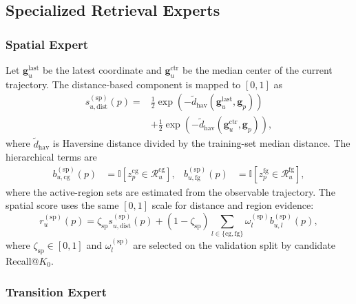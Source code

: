 \documentclass[journal]{IEEEtran}
\newcommand{\Ind}{\mathbb{I}}
\begin{document}
\subsection{Specialized Retrieval Experts}
\label{subsec:experts}

\subsubsection{Spatial Expert}

Let $\bm{g}_{u}^{\mathrm{last}}$ be the latest coordinate and
$\bm{g}_{u}^{\mathrm{ctr}}$ be the median center of the current trajectory.
The distance-based component is mapped to $[0,1]$ as
\begin{equation}
\begin{aligned}
s_{u,\mathrm{dist}}^{(\mathrm{sp})}(p)
={}&\frac{1}{2}\exp\!\left(-\widetilde d_{\mathrm{hav}}
(\bm{g}_{u}^{\mathrm{last}},\bm{g}_{p})\right)\\
&+\frac{1}{2}\exp\!\left(-\widetilde d_{\mathrm{hav}}
(\bm{g}_{u}^{\mathrm{ctr}},\bm{g}_{p})\right),
\end{aligned}
\label{eq:spatial_exact}
\end{equation}
where $\widetilde d_{\mathrm{hav}}$ is Haversine distance divided by the
training-set median distance.
The hierarchical terms are
\begin{align}
b_{u,\mathrm{cg}}^{(\mathrm{sp})}(p)
&=
\Ind[z_p^{\mathrm{cg}}\in\mathcal{R}_{u}^{\mathrm{cg}}],
&
b_{u,\mathrm{fg}}^{(\mathrm{sp})}(p)
&=
\Ind[z_p^{\mathrm{fg}}\in\mathcal{R}_{u}^{\mathrm{fg}}],
\label{eq:spatial_backoff}
\end{align}
where the active-region sets are estimated from the observable trajectory.
The spatial score uses the same $[0,1]$ scale for distance and region evidence:
\begin{equation}
r_u^{(\mathrm{sp})}(p)
=
\zeta_{\mathrm{sp}}s_{u,\mathrm{dist}}^{(\mathrm{sp})}(p)
+
(1-\zeta_{\mathrm{sp}})
\sum_{l\in\{\mathrm{cg},\mathrm{fg}\}}
\omega_l^{(\mathrm{sp})}b_{u,l}^{(\mathrm{sp})}(p),
\label{eq:spatial_fusion}
\end{equation}
where $\zeta_{\mathrm{sp}}\in[0,1]$ and $\omega_l^{(\mathrm{sp})}$ are selected
on the validation split by candidate Recall@$K_0$.

\subsubsection{Transition Expert}
\end{document}
